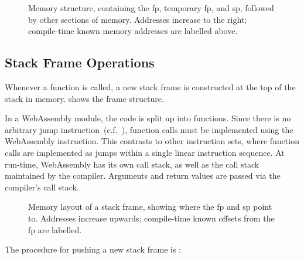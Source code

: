 \documentclass[00-main.tex]{subfiles}
\begin{document}
\begin{figure}[t]
  \centering
  \caption{\protect{}\protect{}%
    Memory structure, containing the \gls{fp}, temporary \acrlong{fp}, and \gls{sp}, followed by other sections of memory.
    Addresses increase to the right; compile-time known memory addresses are labelled above.
    \bigskip
  }%
  \label{fig:memory structure}
\end{figure}

\subsection{Stack Frame Operations}

Whenever a function is called, a new stack frame is constructed at the top of the stack in memory.
 shows the frame structure.

In a WebAssembly module, the code is split up into functions.
Since there is no arbitrary jump instruction~(c.f.~), function calls must be implemented using the WebAssembly  instruction.
This contrasts to other instruction sets, where function calls are implemented as jumps within a single linear instruction sequence.
At run-time, WebAssembly has its own call stack, as well as the call stack maintained by the compiler.
Arguments and return values are passed via the compiler's call stack.

\begin{figure}[!t]
  \centering
  \caption{\protect{}\protect{}%
    Memory layout of a stack frame, showing where the \gls{fp} and \gls{sp} point to.
    Addresses increase upwards; compile-time known offsets from the \gls{fp} are labelled.
  }%
  \label{fig:stack frame layout}
\end{figure}

The procedure for pushing a new stack frame is :

\end{document}
